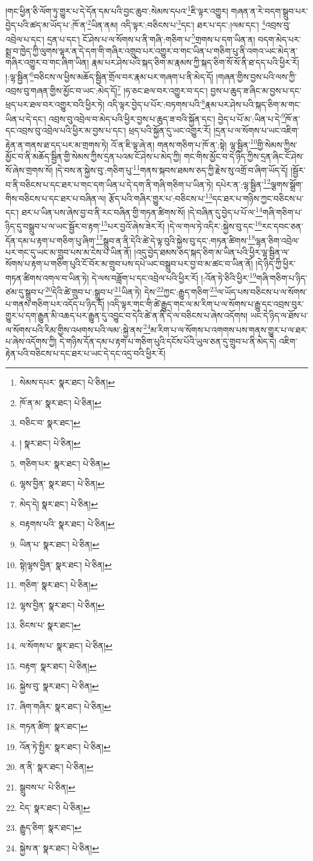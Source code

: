 །གང་ཕྱིན་ཅི་ལོག་ཏུ་གྱུར་པ་དེ་དོན་དམ་པའི་བྱང་ཆུབ་:སེམས་དཔའ་\footnote{སེམས་དཔར་  སྣར་ཐང་།  པེ་ཅིན། }ཇི་ལྟར་འགྱུར། གཞན་ན་རེ་བདག་སྒྲུབ་པར་བྱེད་པའི་ཚད་མ་ཡོད་པ་:ཁོ་ན་\footnote{ཁོ་ན་མ་  སྣར་ཐང་།  པེ་ཅིན། }ཡིན་ནམ། འདི་ལྟར་:བཅིངས་པ་\footnote{བཅིང་བ་  སྣར་ཐང་། }དང་། ཐར་པ་དང་:།ལམ་དང་། \footnote{།   སྣར་ཐང་།  པེ་ཅིན། }འབྲས་བུ་འབྲེལ་པ་དང་། དྲན་པ་དང་། ངོ་ཤེས་པ་ལ་སོགས་པ་ནི་གཞི་:གཅིག་པ་\footnote{གཅིག་པར་  སྣར་ཐང་།  པེ་ཅིན། }གྲགས་པ་དག་ཡིན་ན། བདག་མེད་པར་སྨྲ་བ་ཁྱེད་ཀྱི་ལུགས་ལྟར་ན་དེ་དག་གི་གཞིར་འགྲུབ་པར་འགྱུར་བ་གང་ཡིན་པ་གཅིག་པུ་ནི་འགའ་ཡང་མེད་ན་གཞིར་འགྱུར་བ་གང་ཞིག་ཡིན། རྣམ་པར་ཤེས་པའི་སྐད་ཅིག་མ་རྣམས་ཀྱི་སྐད་ཅིག་སོ་སོ་ནི་ཐ་དད་པའི་ཕྱིར་རོ། །:ལྷ་སྦྱིན་\footnote{ལྷས་བྱིན་  སྣར་ཐང་།  པེ་ཅིན། }བཅིངས་ལ་ཕྱིས་མཆོད་སྦྱིན་གྲོལ་བར་རྣམ་པར་གཞག་པ་ནི་མེད་དོ། །གཞན་གྱིས་བྱས་པའི་ལས་ཀྱི་འབྲས་བུ་གཞན་གྱིས་མྱོང་བ་ཡང་:མེད་དོ།\footnote{མེད་དེ།  སྣར་ཐང་།  པེ་ཅིན། } །ཧ་ཅང་ཐལ་བར་འགྱུར་བ་དང་། བྱས་པ་ཆུད་ཟ་ཞིང་མ་བྱས་པ་དང་ཕྲད་པར་ཐལ་བར་འགྱུར་བའི་ཕྱིར་ཏེ། འདི་ལྟར་བྱེད་པ་པོར་:བཏགས་པའི་\footnote{བརྟགས་པའི་  སྣར་ཐང་།  པེ་ཅིན། }རྣམ་པར་ཤེས་པའི་སྐད་ཅིག་མ་གང་ཡིན་པ་དེ་དང་། འབྲས་བུ་འབྲེལ་བ་མེད་པའི་ཕྱིར་བྱས་པ་ཆུད་ཟ་བའི་སྐྱོན་དང་། བྱེད་པ་པོ་མ་:ཡིན་པ་དེ་\footnote{ཡིན་པ་  སྣར་ཐང་།  པེ་ཅིན། }ཁོ་ན་དང་འབྲས་བུ་འབྲེལ་པའི་ཕྱིར་མ་བྱས་པ་དང་། ཕྲད་པའི་སྐྱོན་དུ་ཡང་འགྱུར་རོ། །དྲན་པ་ལ་སོགས་པ་ཡང་འཇིག་རྟེན་ན་གནས་ཐ་དད་པར་མ་གྲགས་ཏེ། འོ་ན་ཇི་ལྟ་ཞེ་ན། གནས་གཅིག་པ་ཁོ་ན་:སྟེ། ལྷ་སྦྱིན་\footnote{སྟེ།ལྷས་བྱིན་  སྣར་ཐང་།  པེ་ཅིན། }གྱི་སེམས་ཀྱིས་མྱོང་བ་ནི་མཆོད་སྦྱིན་གྱི་སེམས་ཀྱིས་དྲན་པའམ་ངོ་ཤེས་པ་མེད་ཀྱི། གང་གིས་མྱོང་བ་དེ་ཉིད་ཀྱིས་དྲན་ཞིང་ངོ་ཤེས་སོ་ཞེས་གྲགས་སོ། །དེ་བས་ན་སྐྱེས་བུ་:གཅིག་པུ་\footnote{གཅིག་  སྣར་ཐང་།  པེ་ཅིན། }གནས་སྐབས་ཐམས་ཅད་ཀྱི་རྗེས་སུ་འགྲོ་བ་ཞིག་ཡོད་དོ། །སྦྱོར་བ་ནི་བཅིངས་པ་དང་ཐར་པ་གང་དག་ཡིན་པ་དེ་དག་ནི་གཞི་གཅིག་པ་ཡིན་ཏེ། དཔེར་ན་:ལྷ་སྦྱིན་\footnote{ལྷས་བྱིན་  སྣར་ཐང་།  པེ་ཅིན། }ལྕགས་སྒྲོག་གིས་བཅིངས་པ་དང་ཐར་པ་བཞིན་ལ། རྩོད་པའི་གཞིར་གྱུར་པ་:བཅིངས་པ་\footnote{ཅིངས་པ་  སྣར་ཐང་། }དང་ཐར་པ་གཉིས་ཀྱང་བཅིངས་པ་དང་། ཐར་པ་ཡིན་པས་ཞེས་བྱ་བ་ནི་རང་བཞིན་གྱི་གཏན་ཚིགས་སོ། །དེ་བཞིན་དུ་བྱེད་པ་པོ་ལ་\footnote{ལ་སོགས་པ་  སྣར་ཐང་།  པེ་ཅིན། }གཞི་གཅིག་པ་ཉིད་དུ་བསྒྲུབ་པ་ལ་ཡང་སྦྱོར་བ་རྟག་\footnote{བརྟག་  སྣར་ཐང་།  པེ་ཅིན། }པར་བྱའོ་ཞེས་ཟེར་རོ། །དེ་ལ་གལ་ཏེ་འདིར་:སྐྱེས་བུ་དང་\footnote{སྐྱེས་བུ་  སྣར་ཐང་།  པེ་ཅིན། }རང་དབང་ཅན་དོན་དམ་པ་རྟག་པ་གཅིག་པུ་ཞིག་\footnote{ཞིག་གཞིར་  སྣར་ཐང་།  པེ་ཅིན། }སྒྲུབ་ན་ནི་དེའི་ཚེ་དེ་ལྟ་བུའི་སྐྱེས་བུ་དང་:གཏན་ཚིགས་\footnote{གཏན་ཚིག་  སྣར་ཐང་། }ལྷན་ཅིག་འབྲེལ་པར་གང་དུ་ཡང་མ་གྲུབ་པས་མ་ངེས་པ་ཡིན་ནོ། །འདུ་བྱེད་ཐམས་ཅད་སྐད་ཅིག་མ་ཡིན་པའི་ཕྱིར་ལྷ་སྦྱིན་ལ་སོགས་པ་རྟག་པ་གཅིག་པུའི་ངོ་བོར་མ་གྲུབ་པས་དཔེ་ཡང་བསྒྲུབ་པར་བྱ་བ་མ་ཚང་བ་ཡིན་ནོ། །དེ་ཉིད་ཀྱི་ཕྱིར་གཏན་ཚིགས་འགལ་བ་ཡིན་ཏེ། དེ་ལས་བཟློག་པ་དང་འབྲེལ་པའི་ཕྱིར་རོ། །:འོན་ཏེ་ཅིའི་ཕྱིར་\footnote{འོན་ཏེ་སྤྱིར་  སྣར་ཐང་།  པེ་ཅིན། }གཞི་གཅིག་པ་ཉིད་ཙམ་དུ་སྒྲུབ་པ་\footnote{ན་ནི་  སྣར་ཐང་།  པེ་ཅིན། }དེའི་ཚེ་གྲུབ་པ་:སྒྲུབ་པ་\footnote{སྒྲུབས་པ་  པེ་ཅིན། }ཡིན་ཏེ། དེས་\footnote{ངེད་  སྣར་ཐང་།  པེ་ཅིན། }ཀྱང་:རྒྱུད་གཅིག་\footnote{རྒྱུད་ཅིག་  སྣར་ཐང་། }ལ་ཡོད་པས་བཅིངས་པ་ལ་སོགས་པ་གནས་གཅིག་པར་འདོད་པ་ཉིད་དོ། །འདི་ལྟར་གང་གི་ཚེ་རྒྱུད་གང་ལ་མ་རིག་པ་ལ་སོགས་པ་རྒྱུ་དང་འབྲས་བུར་གྱུར་པ་དག་རྒྱུན་མི་འཆད་པར་རྒྱུན་དུ་འབྱུང་བ་དེའི་ཚེ་ན་ནི་དེ་ལ་བཅིངས་པ་ཞེས་འདོགས། ཡང་དེ་ཉིད་ལ་ཐོས་པ་ལ་སོགས་པའི་རིམ་གྱིས་འཕགས་པའི་ལམ་:སྐྱེ་ནས་\footnote{སྐྱེས་ན་  སྣར་ཐང་།  པེ་ཅིན། }མ་རིག་པ་ལ་སོགས་པ་འགགས་པས་གནས་གྱུར་པ་ལ་ཐར་པ་ཞེས་འདོགས་ཀྱི། དེ་གཉིས་དོན་དམ་པ་རྟག་པ་གཅིག་པུའི་དངོས་པོའི་ཡུལ་ཅན་དུ་གྲུབ་པ་ནི་མེད་དེ། འཇིག་རྟེན་པའི་བཅིངས་པ་དང་ཐར་པ་ཡང་དེ་དང་འདྲ་བའི་ཕྱིར་རོ། 